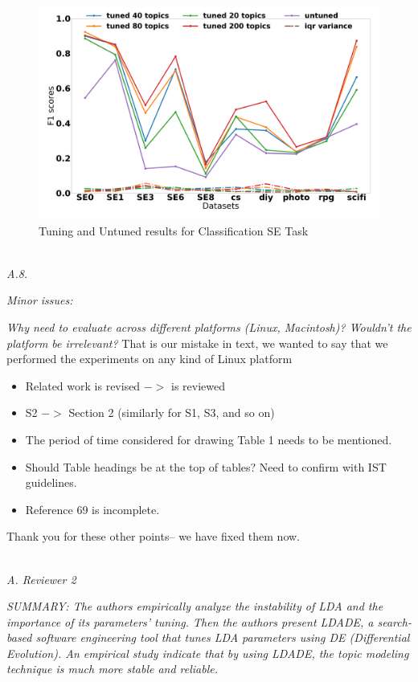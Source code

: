 \documentclass[conference]{IEEEtran}
\newcommand{\bi}{\begin{itemize}}
\newcommand{\ei}{\end{itemize}}
\begin{document}
\begin{figure}[!htbp]
  \includegraphics[width=\linewidth]{./fig/F1.png}
  \caption{Tuning and Untuned results for Classification SE Task}
  \label{fig:f1}
\end{figure}

\noindent
\textit{\\A.8.}  

\textit{Minor issues:}
 
{\em Why need to evaluate across different platforms (Linux, Macintosh)? Wouldn't the platform be irrelevant?}
That is our mistake in text, we wanted to say that we performed the experiments on any kind of Linux platform

{\em \bi
\item Related work is revised $->$ is reviewed
\item S2 $->$ Section 2 (similarly for S1, S3, and so on)
\item The period of time considered for drawing Table 1 needs to be mentioned. 
\item Should Table headings be at the top of tables? Need to confirm with IST guidelines.
\item Reference 69 is incomplete.\\
\ei}

Thank you for these other points-- we have fixed them now.

\noindent
\textit{\\A. Reviewer 2}

\textit{SUMMARY: The authors empirically analyze the instability of LDA and the importance of its parameters' tuning. Then the authors present LDADE, a search-based software engineering tool that tunes LDA parameters using DE (Differential Evolution). An empirical study indicate that by using LDADE, the topic modeling technique is much more stable and reliable.}
\end{document}
